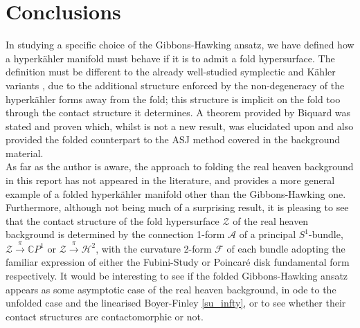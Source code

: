 \documentclass[a4paper,12pt, onecolumn, notitlepage]{article}
\theoremstyle{definition}
\theoremstyle{remark}
\newcommand{\K}{K\"ahler }
\newcommand{\HK}{hyperk\"ahler }
\begin{document}
\section{Conclusions}
In studying a specific choice of the Gibbons-Hawking ansatz, we have defined how a \HK manifold must behave if it is to admit a fold hypersurface. The definition must be different to the already well-studied symplectic and \K variants \cite{dasilva_2000, baykur_2006}, due to the additional structure enforced by the non-degeneracy of the \HK forms away from the fold; this structure is implicit on the fold too through the contact structure it determines. A theorem provided by Biquard \cite{biquard_2015} was stated and proven which, whilst is not a new result, was elucidated upon and also provided the folded counterpart to the ASJ method covered in the background material.\\
As far as the author is aware, the approach to folding the real heaven background in this report has not appeared in the literature, and provides a more general example of a folded \HK manifold other than the Gibbons-Hawking one. Furthermore, although not being much of a surprising result, it is pleasing to see that the contact structure of the fold hypersurface $\mathcal{Z}$ of the real heaven background is determined by the connection 1-form $\mathcal{A}$ of a principal $S^{1}$-bundle, $\mathcal{Z}\overset{\pi}{\rightarrow}\mathbb{C}P^{1}$ or $\mathcal{Z}\overset{\pi}{\rightarrow}\mathcal{H}^{2}$, with the curvature 2-form $\mathcal{F}$ of each bundle adopting the familiar expression of either the Fubini-Study or Poincar\'e disk fundamental form respectively. It would be interesting to see if the folded Gibbons-Hawking ansatz appears as some asymptotic case of the real heaven background, in ode to the unfolded case and the linearised Boyer-Finley \cref{su_infty}, or to see whether their contact structures are contactomorphic or not.


 

	
\end{document}
